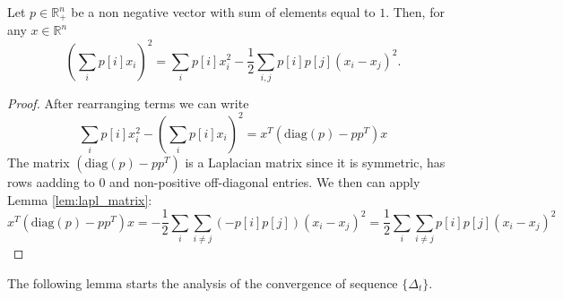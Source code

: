 \documentclass{article}
\begin{document}
\begin{lemma} \label{lem:prob_dist}
Let $p \in \mathbb{R}^n_+$ be a non negative vector with sum of elements equal to $1$. Then, for any $x \in \mathbb{R}^n$
\begin{equation*}
\left( \sum_i p[i] x_i \right)^2 = \sum_i p[i] x_i^2  - \frac{1}{2} \sum_{i,j} p[i] p[j] (x_i - x_j)^2.
\end{equation*}
\end{lemma}
\begin{proof}
After rearranging terms we can write
\begin{equation*}
\sum_i p[i] x_i^2 - \left( \sum_i p[i] x_i \right)^2 = x^T (\text{diag}(p) - pp^T) x
\end{equation*}
The matrix $(\text{diag}(p) - pp^T)$ is a Laplacian matrix since it is symmetric, has rows aadding to $0$ and non-positive off-diagonal entries. We then can apply Lemma \ref{lem:lapl_matrix}:
\begin{equation*}
x^T (\text{diag}(p) - pp^T) x = -\frac{1}{2} \sum_i \sum_{i\ne j} (-p[i] p[j]) (x_i - x_j)^2 = \frac{1}{2} \sum_i \sum_{i\ne j} p[i] p[j]  (x_i - x_j)^2
\end{equation*}
\end{proof}
The following lemma starts the analysis of the convergence of sequence $\{ \Delta_t \}$.
\end{document}
